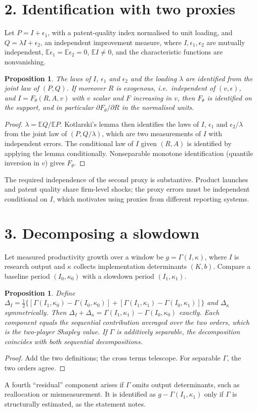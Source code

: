 \documentclass[11pt]{article}
\newtheorem{proposition}[theorem]{Proposition}
\theoremstyle{definition}
\begin{document}
\section*{2. Identification with two proxies}
Let $P=I+\epsilon_1$, with a patent-quality index normalised to unit loading, and $Q=\lambda I+\epsilon_2$, an independent
improvement measure, where $I,\epsilon_1,\epsilon_2$ are mutually independent, $\mathbb E\epsilon_1=\mathbb E\epsilon_2=0$,
$\mathbb EI\ne0$, and the characteristic functions are nonvanishing.
\begin{proposition}\label{prop:kot}
The laws of $I$, $\epsilon_1$ and $\epsilon_2$ and the loading $\lambda$ are identified from the joint law of $(P,Q)$.
If moreover $R$ is exogenous, i.e.\ independent of $(v,\epsilon)$, and $I=F_\theta(R,A,v)$ with $v$ scalar and $F$
increasing in $v$, then $F_\theta$ is identified on the support, and in particular $\partial F_\theta/\partial R$ in the
normalised units.
\end{proposition}
\begin{proof}
$\lambda=\mathbb EQ/\mathbb EP$. Kotlarski's lemma then identifies the laws of $I$, $\epsilon_1$ and $\epsilon_2/\lambda$
from the joint law of $(P,Q/\lambda)$, which are two measurements of $I$ with independent errors. The conditional law of
$I$ given $(R,A)$ is identified by applying the lemma conditionally. Nonseparable monotone identification (quantile inversion
in $v$) gives $F_\theta$.
\end{proof}
The required independence of the second proxy is substantive. Product launches and patent quality share firm-level shocks;
the proxy errors must be independent conditional on $I$, which motivates using proxies from different reporting systems.

\section*{3. Decomposing a slowdown}
Let measured productivity growth over a window be $g=\Gamma(I,\kappa)$, where $I$ is research output and $\kappa$
collects implementation determinants $(K,b)$. Compare a baseline period $(I_0,\kappa_0)$ with a slowdown period $(I_1,\kappa_1)$.
\begin{proposition}\label{prop:shapley}
Define
$\Delta_I=\tfrac12\{[\Gamma(I_1,\kappa_0)-\Gamma(I_0,\kappa_0)]+[\Gamma(I_1,\kappa_1)-\Gamma(I_0,\kappa_1)]\}$ and
$\Delta_\kappa$ symmetrically. Then $\Delta_I+\Delta_\kappa=\Gamma(I_1,\kappa_1)-\Gamma(I_0,\kappa_0)$ exactly. Each
component equals the sequential contribution averaged over the two orders, which is the two-player Shapley value. If $\Gamma$ is
additively separable, the decomposition coincides with both sequential decompositions.
\end{proposition}
\begin{proof}
Add the two definitions; the cross terms telescope. For separable $\Gamma$, the two orders agree.
\end{proof}
A fourth ``residual'' component arises if $\Gamma$ omits output determinants, such as reallocation or mismeasurement. It is
identified as $g-\Gamma(I_1,\kappa_1)$ only if $\Gamma$ is structurally estimated, as the statement notes.
\end{document}
